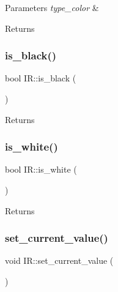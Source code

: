 \begin{DoxyParams}{Parameters}
{\em type\+\_\+color} & \\
\hline
\end{DoxyParams}
\begin{DoxyReturn}{Returns}

\end{DoxyReturn}
\mbox{\label{class_i_r_a2f62691ee90ca2a9035c088029dab4bb}} 
\subsubsection{\texorpdfstring{is\+\_\+black()}{is\_black()}}
{\footnotesize\ttfamily bool I\+R\+::is\+\_\+black (\begin{DoxyParamCaption}{ }\end{DoxyParamCaption})}

\begin{DoxyReturn}{Returns}

\end{DoxyReturn}
\mbox{\label{class_i_r_ae05cf1ad5888262586007946f21ac14e}} 
\subsubsection{\texorpdfstring{is\+\_\+white()}{is\_white()}}
{\footnotesize\ttfamily bool I\+R\+::is\+\_\+white (\begin{DoxyParamCaption}{ }\end{DoxyParamCaption})}

\begin{DoxyReturn}{Returns}

\end{DoxyReturn}
\mbox{\label{class_i_r_a2d60cbf66f48bad8167e2c4231ed3f95}} 
\subsubsection{\texorpdfstring{set\+\_\+current\+\_\+value()}{set\_current\_value()}}
{\footnotesize\ttfamily void I\+R\+::set\+\_\+current\+\_\+value (\begin{DoxyParamCaption}{ }\end{DoxyParamCaption})}

